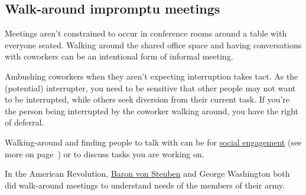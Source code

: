 \subsection*{Walk-around impromptu meetings\label{sec:walk-arounds}}

Meetings aren't constrained to occur in conference rooms around a table with everyone seated. Walking around the shared office space and having conversations with coworkers can be an intentional form of informal meeting. 

Ambushing coworkers when they aren't expecting interruption takes tact. As the (potential) interrupter, you need to be sensitive that other people may not want to be interrupted, while others seek diversion from their current task. If you're the person being interrupted by the coworker walking around, you have the right of deferral. 

Walking-around and finding people to talk with can be for 
\hyperref[sec:socializing]{social engagement} (see more on 
page~\pageref{sec:socializing}) 
or to discuss tasks you are working on. 





In the American Revolution, \href{https://en.wikipedia.org/wiki/Friedrich_Wilhelm_von_Steuben}{Baron von Steuben} and George Washington both did walk-around meetings to understand needs of the members of their army. 